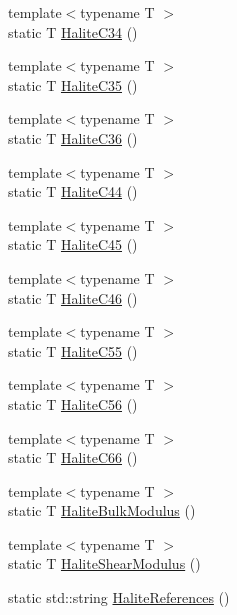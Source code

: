 \begin{DoxyCompactItemize}
\item 
{\footnotesize template$<$typename T $>$ }\\static T \mbox{\hyperlink{namespacempc_1_1data_ae08f50d4f4c283b91d74ad50e4500b8b}{Halite\+C34}} ()
\item 
{\footnotesize template$<$typename T $>$ }\\static T \mbox{\hyperlink{namespacempc_1_1data_a08029f544b5c59abbd188b8e2290230f}{Halite\+C35}} ()
\item 
{\footnotesize template$<$typename T $>$ }\\static T \mbox{\hyperlink{namespacempc_1_1data_a051aa7fdc8397d4b6ec7bcb5df2040af}{Halite\+C36}} ()
\item 
{\footnotesize template$<$typename T $>$ }\\static T \mbox{\hyperlink{namespacempc_1_1data_a52fafc4fc57a56dfb67449334d667a81}{Halite\+C44}} ()
\item 
{\footnotesize template$<$typename T $>$ }\\static T \mbox{\hyperlink{namespacempc_1_1data_a13923fb11143d867b1cbebddb53da163}{Halite\+C45}} ()
\item 
{\footnotesize template$<$typename T $>$ }\\static T \mbox{\hyperlink{namespacempc_1_1data_a71d20604dc0309add7723694a49ce6c1}{Halite\+C46}} ()
\item 
{\footnotesize template$<$typename T $>$ }\\static T \mbox{\hyperlink{namespacempc_1_1data_a43eda237165fb032e3519be2ec28c48c}{Halite\+C55}} ()
\item 
{\footnotesize template$<$typename T $>$ }\\static T \mbox{\hyperlink{namespacempc_1_1data_ad793da2c59a42c660a28400365a109ea}{Halite\+C56}} ()
\item 
{\footnotesize template$<$typename T $>$ }\\static T \mbox{\hyperlink{namespacempc_1_1data_a83fd1eb0c7a98fda68f363c1d0d03153}{Halite\+C66}} ()
\item 
{\footnotesize template$<$typename T $>$ }\\static T \mbox{\hyperlink{namespacempc_1_1data_a9fec94c3481a923b9e61294d9b035ea7}{Halite\+Bulk\+Modulus}} ()
\item 
{\footnotesize template$<$typename T $>$ }\\static T \mbox{\hyperlink{namespacempc_1_1data_af941310481310064722df135c7d8df36}{Halite\+Shear\+Modulus}} ()
\item 
static std\+::string \mbox{\hyperlink{namespacempc_1_1data_abec8a93faf59e884c149c84fe779700e}{Halite\+References}} ()

\end{DoxyCompactItemize}
